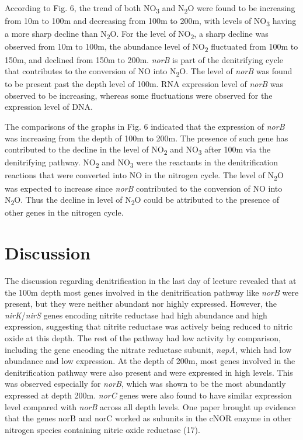 \documentclass[11 pt,]{article}
\begin{document}
According to Fig. 6, the trend of both NO\textsubscript{3} and
N\textsubscript{2}O were found to be increasing from 10m to 100m and
decreasing from 100m to 200m, with levels of NO\textsubscript{3} having
a more sharp decline than N\textsubscript{2}O. For the level of
NO\textsubscript{2}, a sharp decline was observed from 10m to 100m, the
abundance level of NO\textsubscript{2} fluctuated from 100m to 150m, and
declined from 150m to 200m. \emph{norB} is part of the denitrifying
cycle that contributes to the conversion of NO into N\textsubscript{2}O.
The level of \emph{norB} was found to be present past the depth level of
100m. RNA expression level of \emph{norB} was observed to be increasing,
whereas some fluctuations were observed for the expression level of DNA.

The comparisons of the graphs in Fig. 6 indicated that the expression of
\emph{norB} was increasing from the depth of 100m to 200m. The presence
of such gene has contributed to the decline in the level of
NO\textsubscript{2} and NO\textsubscript{3} after 100m via the
denitrifying pathway. NO\textsubscript{2} and NO\textsubscript{3} were
the reactants in the denitrification reactions that were converted into
NO in the nitrogen cycle. The level of N\textsubscript{2}O was expected
to increase since \emph{norB} contributed to the conversion of NO into
N\textsubscript{2}O. Thus the decline in level of N\textsubscript{2}O
could be attributed to the presence of other genes in the nitrogen
cycle.

\section{Discussion}\label{discussion}

The discussion regarding denitrification in the last day of lecture
revealed that at the 100m depth most genes involved in the
denitrification pathway like \emph{norB} were present, but they were
neither abundant nor highly expressed. However, the
\emph{nirK}/\emph{nirS} genes encoding nitrite reductase had high
abundance and high expression, suggesting that nitrite reductase was
actively being reduced to nitric oxide at this depth. The rest of the
pathway had low activity by comparison, including the gene encoding the
nitrate reductase subunit, \emph{napA}, which had low abundance and low
expression. At the depth of 200m, most genes involved in the
denitrification pathway were also present and were expressed in high
levels. This was observed especially for \emph{norB}, which was shown to
be the most abundantly expressed at depth 200m. \emph{norC} genes were
also found to have similar expression level compared with \emph{norB}
across all depth levels. One paper brought up evidence that the genes
norB and norC worked as subunits in the cNOR enzyme in other nitrogen
species containing nitric oxide reductase (17).
\end{document}
